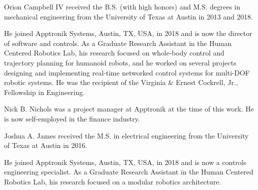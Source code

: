 \documentclass{ieeeaccess}
\begin{document}
\begin{IEEEbiography}{Orion Campbell IV}  received the B.S. (with high honors) and M.S. degrees in mechanical engineering from the University of Texas at Austin in 2013 and 2018.	

He joined Apptronik Systems, Austin,
TX, USA, in 2018 and is now the director of software and controls.
As a Graduate Research Assistant in the Human Centered Robotics Lab, his research focused on whole-body control and trajectory planning for humanoid robots, and he worked on several projects designing and implementing real-time networked control systems for multi-DOF robotic systems. He was the recipient of the Virginia \& Ernest Cockrell, Jr., Fellowship in Engineering.
	
\end{IEEEbiography}

\begin{IEEEbiography}{Nick B. Nichols} was a project manager at Apptronik at the time of this work. He is now self-employed in the finance industry.
	
\end{IEEEbiography}

\begin{IEEEbiography}{Joshua A. James} received the M.S. in electrical engineering from the University of Texas at Austin in 2016.	
	
He joined Apptronik Systems, Austin, TX, USA, in 2018 and is now a controls engineering specialist.
As a Graduate Research Assistant in the Human Centered Robotics Lab, his research focused on a modular robotics architecture.
	
\end{IEEEbiography}
\end{document}
